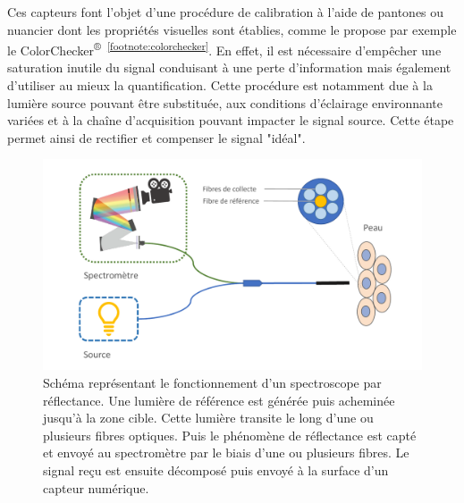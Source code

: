 Ces capteurs font l'objet d'une procédure de calibration à l'aide de pantones ou nuancier dont les propriétés visuelles sont établies, comme le propose par exemple le ColorChecker\textsuperscript{®}~\textsuperscript{\ref{footnote:colorchecker}}. En effet, il est nécessaire d'empêcher une saturation inutile du signal conduisant à une perte d'information mais également d'utiliser au mieux la quantification. Cette procédure est notamment due  à la lumière source pouvant être substituée, aux conditions d'éclairage environnante variées et à la chaîne d'acquisition pouvant impacter le signal source. Cette étape permet ainsi de rectifier et compenser le signal "idéal".\par

\begin{figure}[H]
    \centering
    \includegraphics[width=\linewidth]{contents/chapter_2/resources/scheme_principle_spectroscopy.pdf}
    \caption{Schéma représentant le fonctionnement d'un spectroscope par réflectance. Une lumière de référence est générée puis acheminée jusqu'à la zone cible. Cette lumière transite le long d'une ou plusieurs fibres optiques. Puis le phénomène de réflectance est capté et envoyé au spectromètre par le biais d'une ou plusieurs fibres. Le signal reçu est ensuite décomposé puis envoyé à la surface d'un capteur numérique.}
    \label{fig:spectroscopy_principle}
\end{figure}\par

\addtocounter{footnote}{1}

\addtocounter{footnote}{1}

